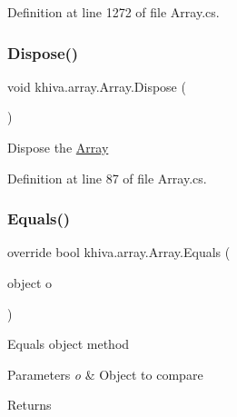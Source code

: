 Definition at line 1272 of file Array.\+cs.

\mbox{\label{classkhiva_1_1array_1_1_array_a28ae91149f1cfb1974b3ebb91f013421}} 
\subsubsection{\texorpdfstring{Dispose()}{Dispose()}}
{\footnotesize\ttfamily void khiva.\+array.\+Array.\+Dispose (\begin{DoxyParamCaption}{ }\end{DoxyParamCaption})\hspace{0.3cm}{\ttfamily [inline]}}



Dispose the \mbox{\hyperlink{classkhiva_1_1array_1_1_array}{Array}} 



Definition at line 87 of file Array.\+cs.

\mbox{\label{classkhiva_1_1array_1_1_array_a3ace1346ee73dfa29c0aeb396526250e}} 
\subsubsection{\texorpdfstring{Equals()}{Equals()}}
{\footnotesize\ttfamily override bool khiva.\+array.\+Array.\+Equals (\begin{DoxyParamCaption}\item[{object}]{o }\end{DoxyParamCaption})\hspace{0.3cm}{\ttfamily [inline]}}



Equals object method 


\begin{DoxyParams}{Parameters}
{\em o} & Object to compare\\
\hline
\end{DoxyParams}
\begin{DoxyReturn}{Returns}

\end{DoxyReturn}


